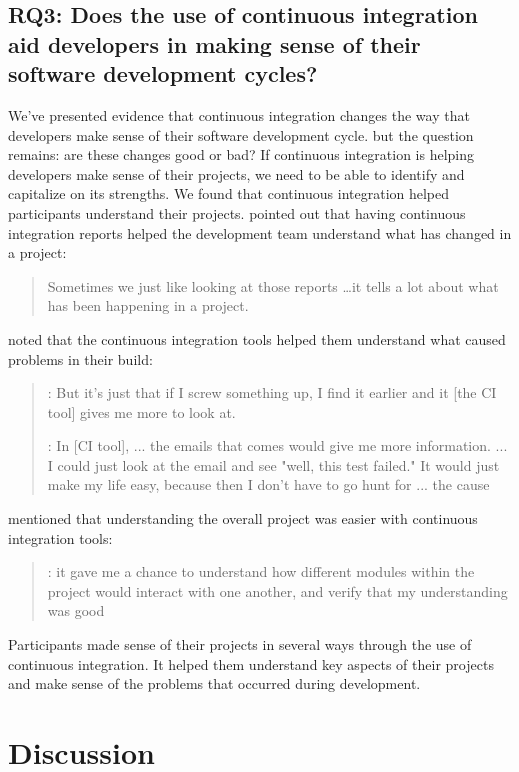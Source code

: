 \documentclass{sig-alternate}
\begin{document}
\subsection{RQ3: Does the use of continuous integration aid developers in making sense of their software development cycles?}
We've presented evidence that continuous integration changes the way that developers make sense of their software development cycle. but the question remains: are these changes good or bad? If continuous integration is helping developers make sense of their projects, we need to be able to identify and capitalize on its strengths.
We found that continuous integration helped participants understand their projects. \srutitwo pointed out that having continuous integration reports helped the development team understand what has changed in a project:
\begin{quote}
	Sometimes we just like looking at those reports \ldots it tells a lot about what has been happening  in a project.  
\end{quote}
\caius noted that the continuous integration tools helped them understand what caused problems in their build:
\begin{quote}
	\caius: But it's just that if I screw something up, I find it earlier and it [the CI tool] gives me more to look at.
	
	\caius: In [CI tool], ... the emails that comes would give me more information. ... I could just look at the email and see "well, this test failed." It would just make my life easy, because then I don't have to go hunt for ... the cause
\end{quote}
\david mentioned that understanding the overall project was easier with continuous integration tools:
\begin{quote}
	\david: it gave me a chance to understand how different modules within the project would interact with one another, and verify that my understanding was good
\end{quote}

Participants made sense of their projects in several ways through the use of continuous integration. It helped them understand key aspects of their projects and make sense of the problems that occurred during development. 
\section{Discussion}
\end{document}
